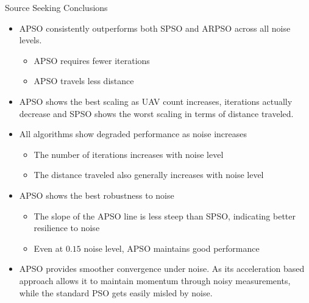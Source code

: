 \documentclass[aspectratio=169]{beamer}
\begin{document}
\begin{frame}{Source Seeking Conclusions}    
    \begin{itemize}
        \item APSO consistently outperforms both SPSO and ARPSO across all noise levels.
        \begin{itemize}
            \item APSO requires fewer iterations
            \item APSO travels less distance
        \end{itemize}
        \item APSO shows the best scaling as UAV count increases, iterations actually decrease and SPSO shows the worst scaling in terms of distance traveled.
        \item All algorithms show degraded performance as noise increases
        \begin{itemize}
            \item The number of iterations increases with noise level
            \item The distance traveled also generally increases with noise level
        \end{itemize}
        \item APSO shows the best robustness to noise
        \begin{itemize}
            \item The slope of the APSO line is less steep than SPSO, indicating better resilience to noise
            \item Even at $0.15$ noise level, APSO maintains good performance
        \end{itemize}
        \item APSO provides smoother convergence under noise. As its acceleration based approach allows it to maintain momentum through noisy measurements, while the standard PSO gets easily misled by noise.
    \end{itemize}
\end{frame}
\end{document}

